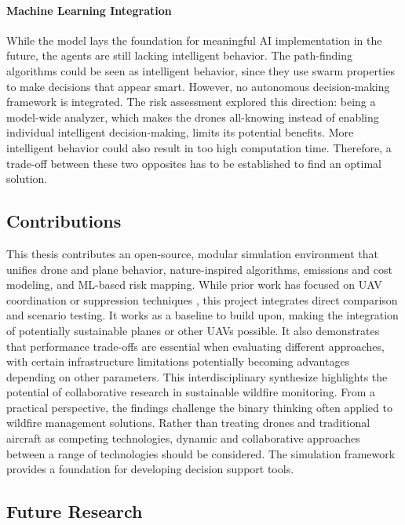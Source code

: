 \documentclass[11pt, a4paper]{article}
\begin{document}
\paragraph{Machine Learning Integration} While the model lays the foundation for meaningful AI implementation in the future, the agents are still lacking intelligent behavior. The path-finding algorithms could be seen as intelligent behavior, since they use swarm properties to make decisions that appear smart. However, no autonomous decision-making framework is integrated. The risk assessment explored this direction: being a model-wide analyzer, which makes the drones all-knowing instead of enabling individual intelligent decision-making, limits its potential benefits. More intelligent behavior could also result in too high computation time. Therefore, a trade-off between these two opposites has to be established to find an optimal solution.

\subsection{Contributions}
This thesis contributes an open-source, modular simulation environment that unifies drone and plane behavior, nature-inspired algorithms, emissions and cost modeling, and ML-based risk mapping. While prior work has focused on UAV coordination \citep{Afghah2019} or suppression techniques \citep{fireBalls}, this project integrates direct comparison and scenario testing. It works as a baseline to build upon, making the integration of potentially sustainable planes or other UAVs possible. It also demonstrates that performance trade-offs are essential when evaluating different approaches, with certain infrastructure limitations potentially becoming advantages depending on other parameters. This interdisciplinary synthesize highlights the potential of collaborative research in sustainable wildfire monitoring.
From a practical perspective, the findings challenge the binary thinking often applied to wildfire management solutions. Rather than treating drones and traditional aircraft as competing technologies, dynamic and collaborative approaches between a range of technologies should be considered.
The simulation framework provides a foundation for developing decision support tools.

\subsection{Future Research}
\end{document}
